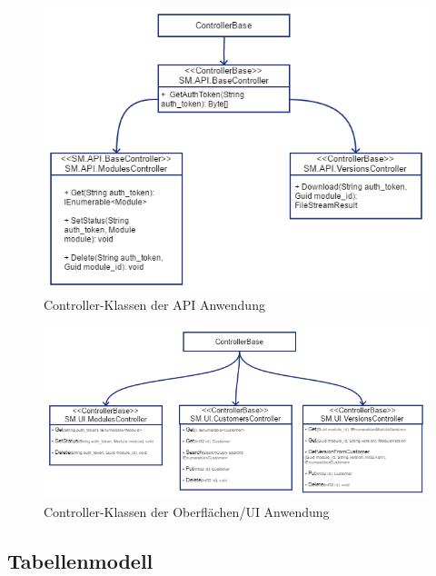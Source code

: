 \begin{center}
    \begin{figure}[H]
        \centering
        \includegraphics[scale=0.4]{content/attachments/c-api-cntrl.png}
        \caption{Controller-Klassen der API Anwendung}
        \label{fig:c-api-cntrl}
    \end{figure}
    
    \begin{figure}[H]
        \centering
        \includegraphics[scale=0.4]{content/attachments/c-ui-cntrl.png}
        \caption{Controller-Klassen der Oberflächen/UI Anwendung}
        \label{fig:s_cus_view}
    \end{figure}
\end{center}

\subsection{Tabellenmodell}
\label{app:database_table}

